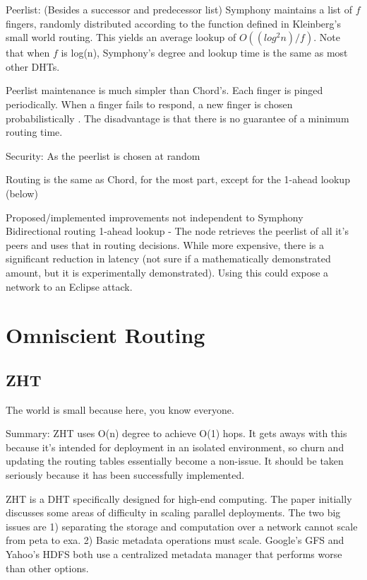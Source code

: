 \documentclass[10pt,letterpaper]{report}
\begin{document}
Peerlist:  (Besides a successor and predecessor list) Symphony maintains a list of $f$ fingers, randomly distributed according to the function defined in Kleinberg's small world routing.  This yields an average lookup of $O((log^{2} n)/f)$.  Note that when $f$ is log(n), Symphony's degree and lookup time is the same as most other DHTs.  

Peerlist maintenance is much simpler than Chord's.  Each finger is pinged periodically.  When a finger fails to respond, a new finger is chosen probabilistically .  The disadvantage is that there is no guarantee of a minimum routing time.

Security:  As the peerlist is chosen at random

Routing  is the same as Chord, for the most part, except for the 1-ahead lookup (below)



Proposed/implemented improvements not independent to Symphony
Bidirectional routing
1-ahead lookup - The node retrieves the peerlist of all it's peers and uses that in routing decisions.  While more expensive, there is a significant reduction in latency (not sure if a mathematically demonstrated amount, but it is experimentally demonstrated).  Using this could expose a network to an Eclipse attack.

\section{Omniscient Routing}

\subsection{ZHT}
The world is small because here, you know everyone.

Summary: ZHT\cite{li2013zht} uses O(n) degree to achieve O(1) hops.   It gets aways with this because it's intended for deployment in an isolated environment, so churn and updating the routing tables essentially  become a non-issue. It should be taken seriously because it has been successfully implemented.

ZHT is a DHT specifically designed for high-end computing.  The paper initially discusses  some areas of difficulty in scaling parallel deployments.  The two big issues are 1)  separating the storage and computation over a network cannot scale from peta to exa.  2) Basic metadata operations must scale.  Google's GFS and Yahoo's HDFS both use a centralized metadata manager that performs worse than other options.
\end{document}
